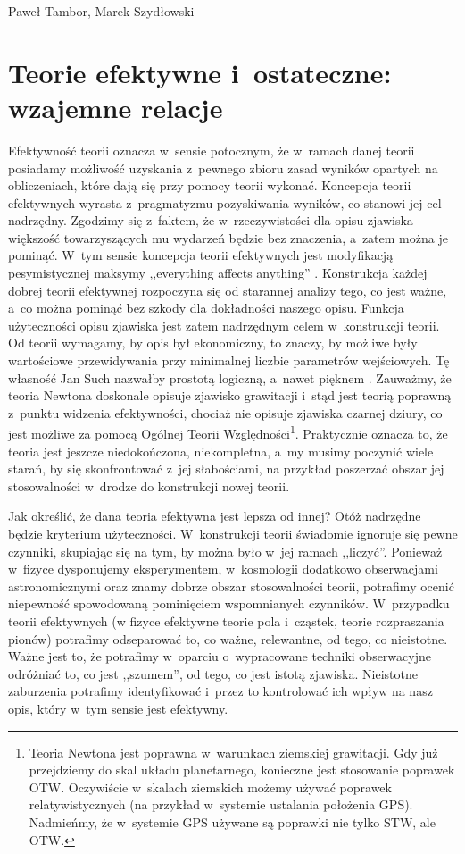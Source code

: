 \begin{artplenv2auth}{Paweł Tambor, Marek Szydłowski}
\section{Teorie efektywne i~ostateczne: wzajemne relacje}
Efektywność teorii oznacza w~sensie potocznym, że w~ramach danej teorii posiadamy możliwość uzyskania z~pewnego zbioru zasad wyników opartych na obliczeniach, które dają się przy pomocy teorii wykonać. Koncepcja teorii efektywnych wyrasta z~pragmatyzmu pozyskiwania wyników, co stanowi jej cel nadrzędny. Zgodzimy się z~faktem, że w~rzeczywistości dla opisu zjawiska większość towarzyszących mu wydarzeń będzie bez znaczenia, a~zatem można je pominąć. W~tym sensie koncepcja teorii efektywnych jest modyfikacją pesymistycznej maksymy ,,everything affects anything''
\parencite[][s.~1]{wells_effective_2012}. %
 Konstrukcja każdej dobrej teorii efektywnej rozpoczyna się od starannej analizy tego, co jest ważne, a~co można pominąć bez szkody dla dokładności naszego opisu. Funkcja użyteczności opisu zjawiska jest zatem nadrzędnym celem w~konstrukcji teorii. Od teorii wymagamy, by opis był ekonomiczny, to znaczy, by możliwe były wartościowe przewidywania przy minimalnej liczbie parametrów wejściowych. Tę własność Jan Such nazwałby prostotą logiczną, a~nawet pięknem 
\parencites[por.][s.~45]{such_czy_1975}[zob. także][s.~45]{such_na_2014}. %
 Zauważmy, że teoria Newtona doskonale opisuje zjawisko grawitacji i~stąd jest teorią poprawną z~punktu widzenia efektywności, chociaż nie opisuje zjawiska czarnej dziury, co jest możliwe za pomocą Ogólnej Teorii Względności\footnote{Teoria Newtona jest poprawna w~warunkach ziemskiej grawitacji. Gdy już przejdziemy do skal układu planetarnego, konieczne jest stosowanie poprawek OTW. Oczywiście w~skalach ziemskich możemy używać poprawek relatywistycznych (na przykład w~systemie ustalania położenia GPS). Nadmieńmy, że w~systemie GPS używane są poprawki nie tylko STW, ale OTW.}. Praktycznie oznacza to, że teoria jest jeszcze niedokończona, niekompletna, a~my musimy poczynić wiele starań, by się skonfrontować z~jej słabościami, na przykład poszerzać obszar jej stosowalności w~drodze do konstrukcji nowej teorii.

Jak określić, że dana teoria efektywna jest lepsza od innej? Otóż nadrzędne będzie kryterium użyteczności. W~konstrukcji teorii świadomie ignoruje się pewne czynniki, skupiając się na tym, by można było w~jej ramach ,,liczyć''. Ponieważ w~fizyce dysponujemy eksperymentem, w~kosmologii dodatkowo obserwacjami astronomicznymi oraz znamy dobrze obszar stosowalności teorii, potrafimy ocenić niepewność spowodowaną pominięciem wspomnianych czynników. W~przypadku teorii efektywnych (w fizyce efektywne teorie pola i~cząstek, teorie rozpraszania pionów) potrafimy odseparować to, co ważne, relewantne, od tego, co nieistotne. Ważne jest to, że potrafimy w~oparciu o~wypracowane techniki obserwacyjne odróżniać to, co jest ,,szumem'', od tego, co jest istotą zjawiska. Nieistotne zaburzenia potrafimy identyfikować i~przez to kontrolować ich wpływ na nasz opis, który w~tym sensie jest efektywny.


\end{artplenv2auth}
